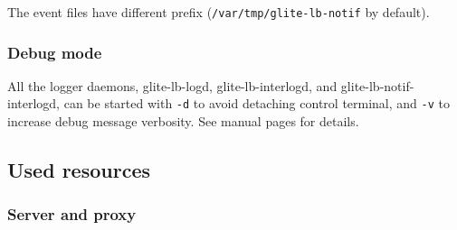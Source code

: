 The event files have different prefix (\verb'/var/tmp/glite-lb-notif' by default).

\subsubsection{Debug mode}

All the logger daemons, \ie glite-lb-logd, glite-lb-interlogd, and
glite-lb-notif-interlogd, can be started with \verb'-d' 
to avoid detaching control terminal, and \verb'-v' to increase 
debug message verbosity.
See manual pages for details.

\subsection{Used resources}
\label{run:resources}

\subsubsection{Server and proxy}


